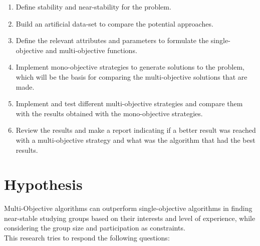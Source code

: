 \begin{enumerate}
    
    \item Define stability and near-stability for the problem.

    \item Build an artificial data-set to compare the potential approaches.

    \item Define the relevant attributes and parameters to formulate the single-objective and multi-objective functions.

    \item Implement mono-objective strategies to generate solutions to the problem, which will be the basis for comparing the multi-objective solutions that are made.

    \item Implement and test different multi-objective strategies and compare them with the results obtained with the mono-objective strategies.

    \item Review the results and make a report indicating if a better result was reached with a multi-objective strategy and what was the algorithm that had the best results.
\end{enumerate}

\section{Hypothesis}

Multi-Objective algorithms can outperform single-objective algorithms in finding near-stable studying groups based on their interests and level of experience, while considering the group size and participation as constraints.\\

This research tries to respond the following questions:

